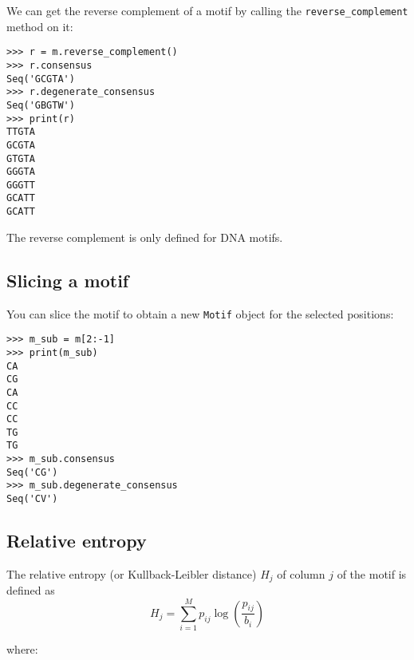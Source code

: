 We can get the reverse complement of a motif by calling the \verb+reverse_complement+ method on it:
\begin{verbatim}
>>> r = m.reverse_complement()
>>> r.consensus
Seq('GCGTA')
>>> r.degenerate_consensus
Seq('GBGTW')
>>> print(r)
TTGTA
GCGTA
GTGTA
GGGTA
GGGTT
GCATT
GCATT
\end{verbatim}
The reverse complement is only defined for DNA motifs.

\subsection{Slicing a motif}

You can slice the motif to obtain a new \verb+Motif+ object for the selected positions:
\begin{verbatim}
>>> m_sub = m[2:-1]
>>> print(m_sub)
CA
CG
CA
CC
CC
TG
TG
>>> m_sub.consensus
Seq('CG')
>>> m_sub.degenerate_consensus
Seq('CV')
\end{verbatim}

\subsection{Relative entropy}
\label{subsec:relative_entropy}

The relative entropy (or Kullback-Leibler distance) $H_j$ of column $j$ of the motif is defined as \cite{schneider1986,durbin1998}
\begin{displaymath}
H_{j} = \sum_{i=1}^{M} p_{ij} \log\left(\frac{p_{ij}}{b_{i}}\right)
\end{displaymath}

\noindent where:

